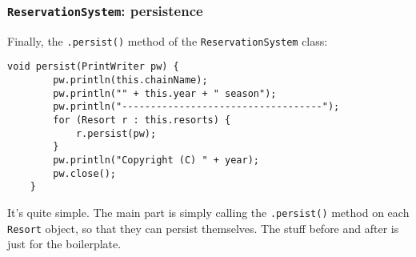 \subsubsection{\texttt{ReservationSystem}: persistence}

Finally, the \texttt{.persist()} method of the \texttt{ReservationSystem}
class:

\begin{Verbatim}[fontsize=\small,samepage=true,frame=single]
    void persist(PrintWriter pw) {
        pw.println(this.chainName);
        pw.println("" + this.year + " season");
        pw.println("-----------------------------------");
        for (Resort r : this.resorts) {
            r.persist(pw);
        }
        pw.println("Copyright (C) " + year);
        pw.close();
    }
\end{Verbatim}

It's quite simple. The main part is simply calling the \texttt{.persist()}
method on each \texttt{Resort} object, so that they can persist themselves.
The stuff before and after is just for the boilerplate.

